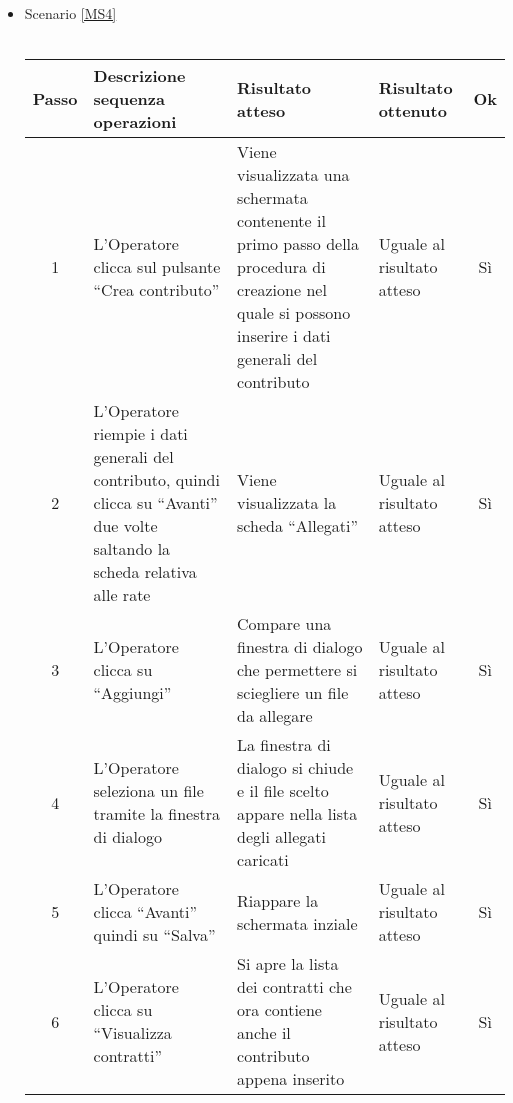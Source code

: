 \begin{itemize}
 \item Scenario \ref{MS4}\\\\
 {
 \footnotesize
  \begin{longtable}{|c|p{3cm}|p{3cm}|p{3cm}|c|}
    \hline
    Passo & Descrizione sequenza operazioni & Risultato atteso & Risultato ottenuto & Ok\\
    \hline
    1 & L'Operatore clicca sul pulsante ``Crea contributo'' & Viene visualizzata una schermata contenente il primo passo della procedura di creazione nel quale si possono inserire i dati generali del contributo& Uguale 
      al risultato atteso& Sì\\
    \hline
    2 & L'Operatore riempie i dati generali del contributo, quindi clicca su ``Avanti'' due volte saltando la scheda relativa alle rate & Viene visualizzata la scheda ``Allegati'' & Uguale al risultato atteso & Sì \\
    \hline
     3 & L'Operatore clicca su ``Aggiungi''& Compare una finestra di dialogo che permettere si sciegliere un file da allegare & Uguale al risultato atteso & Sì \\
    \hline
    4 & L'Operatore seleziona un file tramite la finestra di dialogo & La finestra di dialogo si chiude e il file scelto appare nella lista degli allegati caricati & Uguale al risultato atteso & Sì\\
    \hline
    5 & L'Operatore clicca ``Avanti'' quindi su ``Salva'' & Riappare la schermata inziale & Uguale al risultato atteso & Sì\\
    \hline
    6 & L'Operatore clicca su ``Visualizza contratti''& Si apre la lista dei contratti che ora contiene anche il contributo appena inserito & Uguale al risultato atteso & Sì\\    
    \hline
\end{longtable}

}



\end{itemize}
